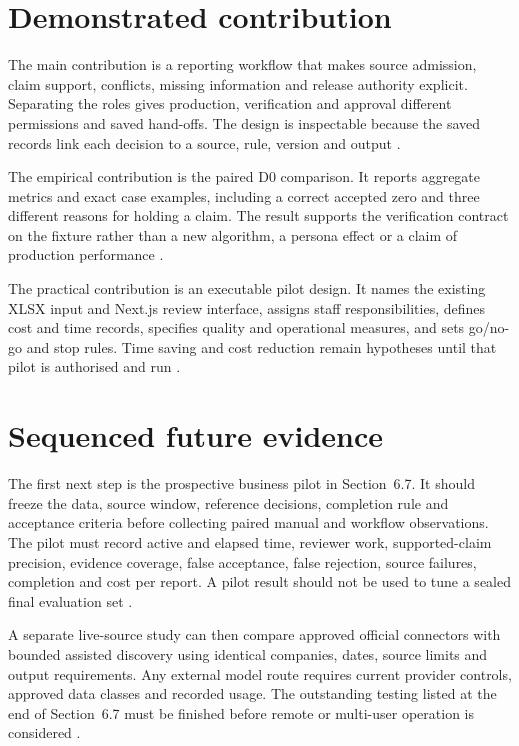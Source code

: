 \section{Demonstrated contribution}

The main contribution is a reporting workflow that makes source admission, claim support, conflicts,
missing information and release authority explicit. Separating the roles gives production,
verification and approval different permissions and saved hand-offs. The design is inspectable
because the saved records link each decision to a source, rule, version and output
\citep{buneman2001provenance,pineau2021reproducibility}.

The empirical contribution is the paired D0 comparison. It reports aggregate metrics and exact case
examples, including a correct accepted zero and three different reasons for holding a claim. The result
supports the verification contract on the fixture rather than a new algorithm, a persona effect or a
claim of production performance \citep{gao2023alce,gao2023rarr}.

The practical contribution is an executable pilot design. It names the existing XLSX input and
Next.js review interface, assigns staff responsibilities, defines cost and time records, specifies
quality and operational measures, and sets go/no-go and stop rules. Time saving and cost reduction
remain hypotheses until that pilot is authorised and run
\citep{peffers2007dsrm,nist2023airmf}.

\section{Sequenced future evidence}

The first next step is the prospective business pilot in Section~6.7. It should freeze the data,
source window, reference decisions, completion rule and acceptance criteria before collecting paired
manual and workflow observations. The pilot must record active and elapsed time, reviewer work,
supported-claim precision, evidence coverage, false acceptance, false rejection, source failures,
completion and cost per report. A pilot result should not be used to tune a sealed final evaluation
set \citep{kapoor2023leakage,pineau2021reproducibility}.

A separate live-source study can then compare approved official connectors with bounded assisted
discovery using identical companies, dates, source limits and output requirements. Any external model
route requires current provider controls, approved data classes and recorded usage. The outstanding
testing listed at the end of Section~6.7 must be finished before remote or multi-user operation is
considered \citep{nist2023airmf,cddo2023genai}.

